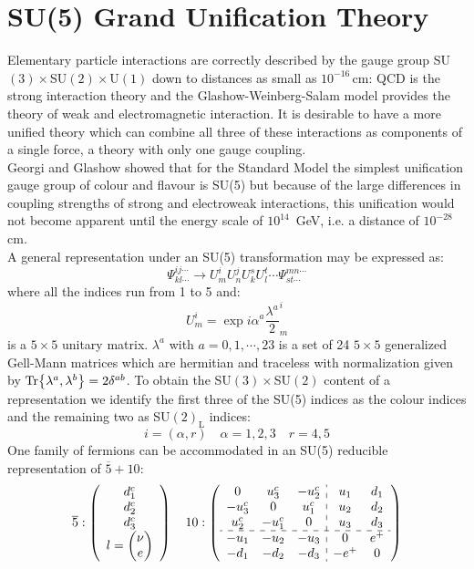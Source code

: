 \documentclass[../main.tex]{subfiles}
\begin{document}
\section{SU(5) Grand Unification Theory}
Elementary particle interactions are correctly described by the gauge group SU$(3)\times$SU$(2)\times$U$(1)$ down to distances as small as $10^{-16}$\,cm: QCD is the strong interaction theory and the Glashow-Weinberg-Salam model provides the theory of weak and electromagnetic interaction. It is desirable to have a more unified theory which can combine all three of these interactions as components of a single force, a theory with only one gauge coupling.\\
Georgi and Glashow showed that for the Standard Model the simplest unification gauge group of colour and flavour is SU(5) but because of the large differences in coupling strengths of strong and electroweak interactions, this unification would not become apparent until the energy scale of $10^{14}$ \,GeV, i.e. a distance of $10^{-28}$\,cm.\\
A general representation under an SU(5) transformation may be expressed as:
\[
\Psi^{ij\cdots}_{kl\cdots}\to U^i_mU^j_nU^s_kU^t_l\cdots\Psi^{mn\cdots}_{st\cdots}
\]
where all the indices run from 1 to 5 and:
\[
U^i_m=\exp{i\alpha^a\frac{\lambda^a}{2}}^i_m
\]
is a $5\times5$ unitary matrix. $\lambda^a$ with $a=0,1,\cdots,23$ is a set of 24 $5\times5$ generalized Gell-Mann matrices which are hermitian and traceless with normalization given by $\Tr{\lambda^a,\lambda^b}=2\delta^{ab}$. To obtain the SU$(3)\times$SU$(2)$ content of a representation we identify the first three of the SU(5) indices as the colour indices and the remaining two as SU$(2)_{\text{L}}$ indices:
\[
i=(\alpha,r) \quad \alpha=1,2,3 \quad r=4,5
\]
One family of fermions can be accommodated in an SU(5) reducible representation of $\overline{5}+10$:
\[
\overline{5}:\left(\begin{array}{c}
d_1^c\\d_2^c\\d_3^c\\l=\begin{pmatrix}\nu\\e
\end{pmatrix}
\end{array}\right) \quad
10: \left(\begin{array}{ccc:cc}
0 & u_3^c & -u_2^c & u_1 & d_1\\
-u_3^c & 0 & u_1^c & u_2 & d_2\\
u_2^c & -u_1^c & 0 & u_3 & d_3\\
\hdashline
-u_1 & -u_2 & -u_3 & 0 & e^+\\
-d_1 & -d_2 & -d_3 & -e^+ & 0
\end{array}\right)
\]
\end{document}
